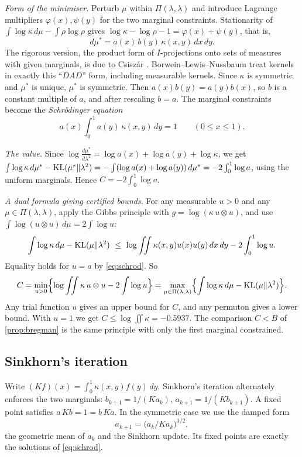 \emph{Form of the minimiser.} Perturb $\mu$ within $\Pi(\lambda,\lambda)$ and introduce
Lagrange multipliers $\varphi(x),\psi(y)$ for the two marginal constraints. Stationarity of
$\int\log\kappa\,d\mu-\int\rho\log\rho$ gives $\log\kappa-\log\rho-1=\varphi(x)+\psi(y)$,
that is,
\[
d\mu^*=a(x)\,b(y)\,\kappa(x,y)\,dx\,dy .
\]
The rigorous version, the product form of $I$-projections onto sets of measures with
given marginals, is due to Csisz\'ar \cite{Csiszar}. Borwein--Lewis--Nussbaum
\cite{BLN} treat kernels in exactly this ``$DAD$'' form, including measurable kernels. Since
$\kappa$ is symmetric and $\mu^*$ is unique, $\mu^*$ is symmetric. Then $a(x)b(y)=a(y)b(x)$,
so $b$ is a constant multiple of $a$, and after rescaling $b=a$. The marginal constraints
become the \emph{Schr\"odinger equation}
\begin{equation}\label{eq:schrod}
a(x)\int_0^1a(y)\,\kappa(x,y)\,dy=1\qquad(0\le x\le1).
\end{equation}

\emph{The value.} Since $\log\frac{d\mu^*}{d\lambda^2}=\log a(x)+\log a(y)+\log\kappa$, we get
$\int\log\kappa\,d\mu^*-\mathrm{KL}(\mu^*\|\lambda^2)=-\int(\log a(x)+\log a(y))\,d\mu^*=-2\int_0^1\log a$,
using the uniform marginals. Hence $C=-2\int_0^1\log a$.

\emph{A dual formula giving certified bounds.} For any measurable $u>0$ and any
$\mu\in\Pi(\lambda,\lambda)$, apply the Gibbs principle with $g=\log(\kappa\,u\otimes u)$, and use
$\int\log(u\otimes u)\,d\mu=2\int\log u$:
\[
\int\log\kappa\,d\mu-\KL(\mu\|\lambda^2)\ \le\ \log\iint\kappa(x,y)u(x)u(y)\,dx\,dy-2\int_0^1\log u .
\]
Equality holds for $u=a$ by \eqref{eq:schrod}. So
\[
C=\min_{u>0}\Bigl\{\log\iint\kappa\,u\otimes u-2\int\log u\Bigr\}
 =\max_{\mu\in\Pi(\lambda,\lambda)}\Bigl\{\int\log\kappa\,d\mu-\mathrm{KL}(\mu\|\lambda^2)\Bigr\}.
\]
Any trial function $u$ gives an upper bound for $C$, and any permuton gives a lower bound.
With $u=1$ we get $C\le\log\iint\kappa=-0.5937$. The comparison $C<B$ of
\cref{prop:bregman} is the same principle with only the first marginal constrained.

\subsection{Sinkhorn's iteration}
Write $(Kf)(x)=\int_0^1\kappa(x,y)f(y)\,dy$. Sinkhorn's iteration
\cite{Sinkhorn,SinkhornKnopp} alternately enforces the two marginals:
$b_{k+1}=1/(Ka_k)$, $a_{k+1}=1/(Kb_{k+1})$. A fixed point satisfies $a\,Kb=1=b\,Ka$. In the
symmetric case we use the damped form
\[
a_{k+1}=\bigl(a_k/Ka_k\bigr)^{1/2},
\]
the geometric mean of $a_k$ and the Sinkhorn update. Its fixed points are exactly the
solutions of \eqref{eq:schrod}.

